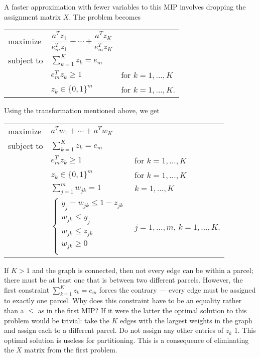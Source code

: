 A faster approximation with fewer variables to this MIP involves
dropping the assignment matrix $X$. The problem becomes

\begin{center}
\bgroup
\def\arraystretch{1.5}
\begin{tabular}{l l l}
maximize   & $\dfrac{a^T z_1}{e_m^T z_1} + \cdots +
              \dfrac{a^T z_K}{e_m^T z_K}$ \\
subject to & $\sum_{k=1}^K z_k = e_m$ \\
           & $e_m^T z_k \geq 1$   & for $k = 1, ..., K$ \\
           & $z_k \in \{0, 1\}^m$ & for $k = 1, ..., K$. \\
\end{tabular}
\egroup
\end{center}

Using the \cite{Li:94} transformation mentioned above, we get

\begin{center}
\bgroup
\def\arraystretch{1.5}
\begin{tabular}{l l l}
maximize   & $a^T w_1 + \cdots + a^T w_K$ \\
subject to & $\sum_{k=1}^K z_k = e_m$ \\
           & $e_m^T z_k \geq 1$  & for $k = 1, ..., K$ \\
           & $z_k \in \{0, 1\}^m$ & for $k = 1, ..., K$ \\
           & $\sum_{j=1}^m w_{jk} = 1$ & $k = 1, ..., K$ \\
           & $\begin{cases}
                y_j - w_{jk} \leq 1 - z_{jk} \\
                w_{jk} \leq y_j \\
                w_{jk} \leq z_{jk} \\
                w_{jk} \geq 0 \\
             \end{cases}$
           & $j = 1, ..., m$, $k = 1, ..., K$. \\
\end{tabular}
\egroup
\end{center}

If $K > 1$ and the graph is connected, then not every edge can be
within a parcel; there must be at least one that is between two
different parcels. However, the first constraint
$\sum_{k=1}^K z_k = e_m$ forces the contrary --- every edge must be
assigned to exactly one parcel. Why does this constraint have to be an
equality rather than a $\leq$ as in the first MIP? If it were the latter
the optimal solution to this problem would be trivial: take the $K$
edges with the largest weights in the graph and assign each to a
different parcel. Do not assign any other entries of $z_k$ 1. This
optimal solution is useless for partitioning. This is a consequence of
eliminating the $X$ matrix from the first problem.

